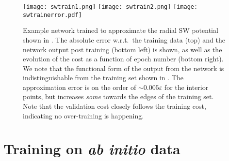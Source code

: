 \documentclass[../../master.tex]{subfiles}
\begin{document}
\begin{figure}
\centering
\texttt{[image: swtrain1.png]}
\texttt{[image: swtrain2.png]}
\texttt{[image: swtrainerror.pdf]}
\caption{Example network trained to approximate the radial SW potential shown in . The absolute error w.r.t.\ the training data (top) and the network output post training (bottom left) is shown, as well as the evolution of the cost as a function of epoch number (bottom right). We note that the functional form of the output from the network is indistinguishable from the training set shown in . The approximation error is on the order of $\sim0.005\varepsilon$ for the interior points, but increases \emph{some} towards the edges of the training set. Note that the validation cost closely follows the training cost, indicating no over-training is happening.\label{fig:swtrain}}
\end{figure}

\section{Training on \emph{ab initio} data}
\end{document}
